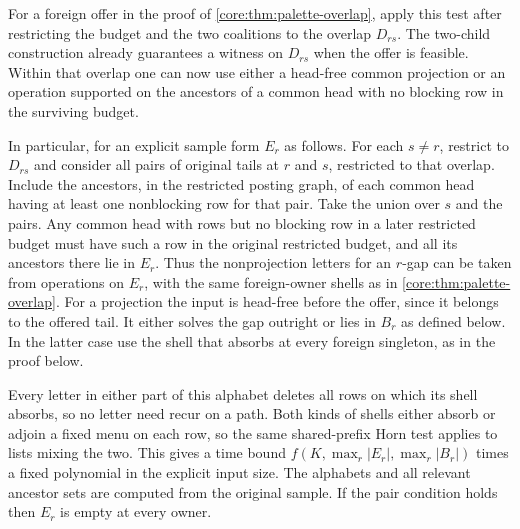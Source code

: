 For a foreign offer in the proof of
\cref{core:thm:palette-overlap}, apply this test after restricting
the budget and the two coalitions to the overlap $D_{rs}$.
The two-child construction already guarantees a witness on
$D_{rs}$ when the offer is feasible. Within that overlap one
can now use either a head-free common projection or an
operation supported on the ancestors of a common head with
no blocking row in the surviving budget.

In particular, for an explicit sample form $E_r$ as follows.
For each $s\ne r$, restrict to $D_{rs}$ and consider all pairs
of original tails at $r$ and $s$, restricted to that overlap.
Include the ancestors, in the restricted posting graph, of
each common head having at least one nonblocking row for
that pair. Take the union over $s$ and the pairs. Any
common head with rows but no blocking row in a later
restricted budget must have such a row in the original
restricted budget, and all its ancestors there lie in $E_r$.
Thus the nonprojection letters for an $r$-gap can be taken
from operations on $E_r$, with the same foreign-owner shells
as in \cref{core:thm:palette-overlap}. For a projection the
input is head-free before the offer, since it belongs to the
offered tail. It either solves the gap outright or lies in
$B_r$ as defined below. In the latter case use the shell
that absorbs at every foreign singleton, as in the proof
below.

Every letter in either part of this alphabet deletes all rows
on which its shell absorbs, so no letter need recur on a
path. Both kinds of shells either absorb or adjoin a fixed
menu on each row, so the same shared-prefix Horn test applies
to lists mixing the two. This gives a time bound
$f(K,\max_r |E_r|,\max_r |B_r|)$ times a fixed polynomial in
the explicit input size. The alphabets and all relevant
ancestor sets are computed from the original sample. If the
pair condition holds then $E_r$ is empty at every owner.

